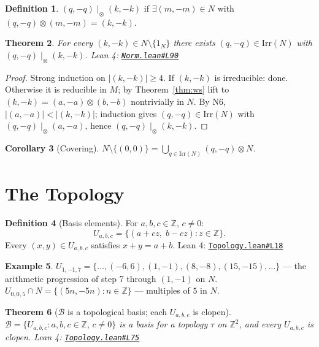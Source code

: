 \documentclass[11pt,a4paper]{amsart}
\theoremstyle{plain}
\newtheorem{theorem}{Theorem}[section]
\newtheorem{corollary}[theorem]{Corollary}
\theoremstyle{definition}
\newtheorem{definition}[theorem]{Definition}
\newtheorem{example}[theorem]{Example}
\theoremstyle{remark}
\newcommand{\tens}{\mathbin{\otimes}}       %
\newcommand{\Z}{\mathbb{Z}}
\newcommand{\Irr}{\mathrm{Irr}}
\newcommand{\GH}{https://github.com/FruitfulApproach/Lean4TPC/blob/main}
\begin{document}
\begin{definition}
$(q,-q) \mid_\tens (k,-k)$ if $\exists (m,-m) \in N$ with
$(q,-q) \tens (m,-m) = (k,-k)$.
\end{definition}

\begin{theorem}
\label{thm:irred-div}
For every $(k,-k) \in N \setminus \{1_N\}$ there exists
$(q,-q) \in \Irr(N)$ with $(q,-q) \mid_\tens (k,-k)$.
\textnormal{Lean 4:} \href{\GH/TPC/Norm.lean\#L90}{\texttt{Norm.lean\#L90}}
\end{theorem}

\begin{proof}
Strong induction on $|(k,-k)| \geq 4$.  If $(k,-k)$ is irreducible: done.
Otherwise it is reducible in $M$; by Theorem~\ref{thm:ws} lift to
$(k,-k) = (a,-a) \tens (b,-b)$ nontrivially in $N$.  By N6,
$|(a,-a)| < |(k,-k)|$; induction gives $(q,-q) \in \Irr(N)$ with
$(q,-q) \mid_\tens (a,-a)$, hence $(q,-q) \mid_\tens (k,-k)$.
\end{proof}

\begin{corollary}[Covering]
\label{cor:cover}
$N \setminus \{(0,0)\} = \bigcup_{q \in \Irr(N)} (q,-q) \tens N$.
\end{corollary}

\section{The Topology}

\begin{definition}[Basis elements]
\label{def:U}
For $a,b,c \in \Z$, $c \neq 0$:
\[
U_{a,b,c} = \{(a+cz,\; b-cz) : z \in \Z\}.
\]
Every $(x,y) \in U_{a,b,c}$ satisfies $x+y = a+b$.
\textnormal{Lean 4:} \href{\GH/TPC/Topology.lean\#L18}{\texttt{Topology.lean\#L18}}
\end{definition}

\begin{example}
$U_{1,-1,7} = \{\ldots,(-6,6),(1,-1),(8,-8),(15,-15),\ldots\}$ ---
the arithmetic progression of step $7$ through $(1,-1)$ on $N$.
$U_{0,0,5} \cap N = \{(5n,-5n) : n \in \Z\}$ --- multiples of $5$ in $N$.
\end{example}

\begin{theorem}[$\mathcal{B}$ is a topological basis; each $U_{a,b,c}$ is clopen]
\label{thm:basis}
$\mathcal{B} = \{U_{a,b,c} : a,b,c \in \Z,\, c \neq 0\}$ is a basis for a
topology $\tau$ on $\Z^2$, and every $U_{a,b,c}$ is clopen.
\textnormal{Lean 4:} \href{\GH/TPC/Topology.lean\#L75}{\texttt{Topology.lean\#L75}}
\end{theorem}
\end{document}
